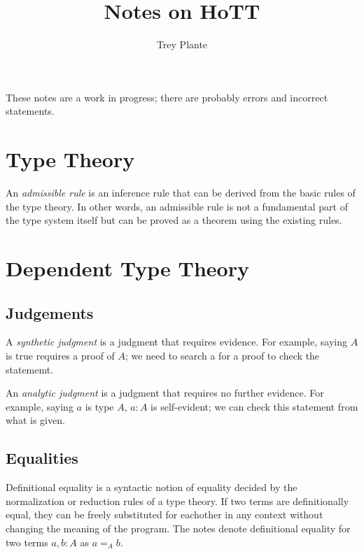 \documentclass{article}
\title{Notes on HoTT}
\author{Trey Plante}
\begin{document}
\maketitle
These notes are a work in progress; there are probably errors and incorrect statements.

\section{Type Theory}

\begin{definition}
  An \emph{admissible rule} is an inference rule that can be derived from the basic rules of the type theory. In other words, an admissible rule is not a fundamental part of the type system itself but can be proved as a theorem using the existing rules.
\end{definition}

\section{Dependent Type Theory}

\subsection{Judgements}

\begin{definition}
  A \emph{synthetic judgment} is a judgment that requires evidence. For example, saying $A$ is true requires a proof of $A$; we need to search a for a proof to check the statememt.
\end{definition}

\begin{definition}
  An \emph{analytic judgment} is a judgment that requires no further evidence. For example, saying $a$ is type $A$, $a : A$ is self-evident; we can check this statement from what is given.
\end{definition}

\subsection{Equalities}

\begin{definition}
  Definitional equality is a syntactic notion of equality decided by the normalization or reduction rules of a type theory. If two terms are definitionally equal, they can be freely substituted for eachother in any context without changing the meaning of the program. The notes denote definitional equality for two terms $a, b : A$ as $a =_{A} b$.
\end{definition}
\end{document}

